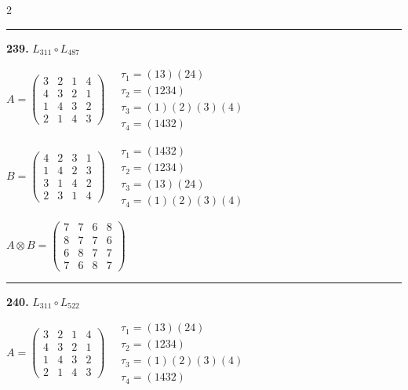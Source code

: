 \begin{multicols}{2}
\vspace{0.3em}
\hrule
\vspace{0.3em}

\noindent\textbf{239.} $L_{311} \circ L_{487}$

$A = \begin{pmatrix} 3 & 2 & 1 & 4 \\ 4 & 3 & 2 & 1 \\ 1 & 4 & 3 & 2 \\ 2 & 1 & 4 & 3 \end{pmatrix} \quad \begin{matrix} \tau_{1}=(1 3)(2 4) \\ \tau_{2}=(1 2 3 4) \\ \tau_{3}=(1)(2)(3)(4) \\ \tau_{4}=(1 4 3 2) \end{matrix}$

$B = \begin{pmatrix} 4 & 2 & 3 & 1 \\ 1 & 4 & 2 & 3 \\ 3 & 1 & 4 & 2 \\ 2 & 3 & 1 & 4 \end{pmatrix} \quad \begin{matrix} \tau_{1}=(1 4 3 2) \\ \tau_{2}=(1 2 3 4) \\ \tau_{3}=(1 3)(2 4) \\ \tau_{4}=(1)(2)(3)(4) \end{matrix}$

$A \otimes B = \begin{pmatrix} 7 & 7 & 6 & 8 \\ 8 & 7 & 7 & 6 \\ 6 & 8 & 7 & 7 \\ 7 & 6 & 8 & 7 \end{pmatrix}$

\vspace{0.3em}
\hrule
\vspace{0.3em}

\noindent\textbf{240.} $L_{311} \circ L_{522}$

$A = \begin{pmatrix} 3 & 2 & 1 & 4 \\ 4 & 3 & 2 & 1 \\ 1 & 4 & 3 & 2 \\ 2 & 1 & 4 & 3 \end{pmatrix} \quad \begin{matrix} \tau_{1}=(1 3)(2 4) \\ \tau_{2}=(1 2 3 4) \\ \tau_{3}=(1)(2)(3)(4) \\ \tau_{4}=(1 4 3 2) \end{matrix}$


\end{multicols}
